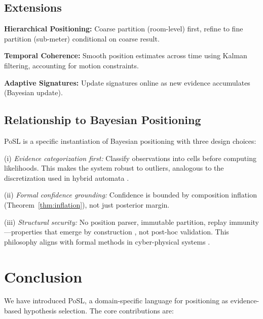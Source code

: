 \documentclass[twocolumn,10pt]{article}
\begin{document}
\subsection{Extensions}

\textbf{Hierarchical Positioning:} Coarse partition (room-level) first,
refine to fine partition (sub-meter) conditional on coarse result.

\textbf{Temporal Coherence:} Smooth position estimates across time using
Kalman filtering, accounting for motion constraints.

\textbf{Adaptive Signatures:} Update signatures online as new evidence
accumulates (Bayesian update).

\subsection{Relationship to Bayesian Positioning}

PoSL is a specific instantiation of Bayesian positioning \cite{thrun2005probabilistic,durrett2010probability}
with three design choices:

(i) \emph{Evidence categorization first:} Classify observations into cells
before computing likelihoods. This makes the system robust to outliers,
analogous to the discretization used in hybrid automata \cite{henzinger1996hybrid}.

(ii) \emph{Formal confidence grounding:} Confidence is bounded by composition
inflation (Theorem~\ref{thm:inflation}), not just posterior margin.

(iii) \emph{Structural security:} No position parser, immutable partition,
replay immunity—properties that emerge by construction \cite{saltzer1975protection},
not post-hoc validation. This philosophy aligns with formal methods in cyber-physical systems \cite{lee2008cyber,desai2016verification}.

\section{Conclusion}
\label{sec:conclusion}

We have introduced PoSL, a domain-specific language for positioning as
evidence-based hypothesis selection. The core contributions are:
\end{document}
